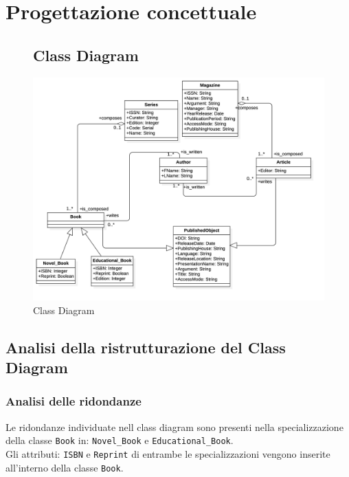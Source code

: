 \chapter{Progettazione concettuale}
		
		
	\begin{figure}[hbt]
	\section{Class Diagram}
	\centering
	\includegraphics[width=1.1\textwidth]{Immagini/ClassDiagram.png}
	\caption{Class Diagram}
	\label{fig:ClassDiagram}
	\end{figure}

    \section{Analisi della ristrutturazione del Class Diagram}
        
        \subsection{Analisi delle ridondanze}
        
        	Le ridondanze individuate nell class diagram sono presenti nella specializzazione della classe \texttt{Book} in: \texttt{Novel\_Book} e \texttt{Educational\_Book}. \\
        	Gli attributi: \texttt{ISBN} e \texttt{Reprint} di entrambe le specializzazioni vengono inserite all'interno della classe \texttt{Book}.
            
